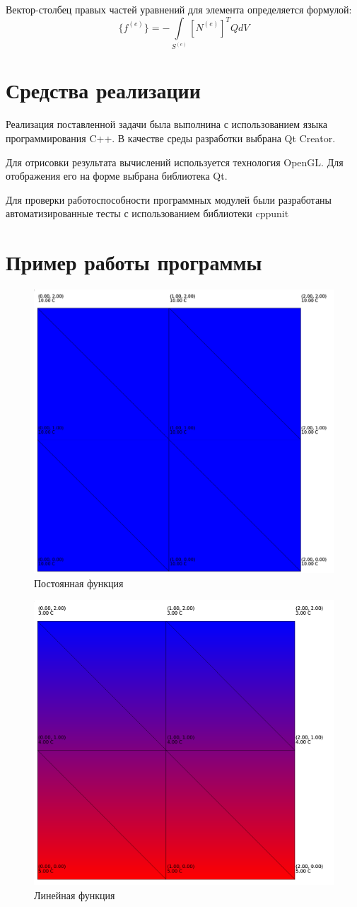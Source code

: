 \documentclass[a4paper, 14pt]{extarticle}
\begin{document}
Вектор-столбец правых частей уравнений для элемента определяется формулой:
\begin{equation}
	\{f^{(e)}\} = - \int\limits_{S^{(e)}} [N^{(e)}]^T QdV
\end{equation}

\clearpage
\section{Средства реализации}

Реализация поставленной задачи была выполнина с использованием языка
программирования C++. В качестве среды разработки выбрана Qt Creator.

Для отрисовки результата вычислений используется технология OpenGL. Для
отображения его на форме выбрана библиотека Qt.

Для проверки работоспособности программных модулей были разработаны
автоматизированные тесты с использованием библиотеки cppunit

\clearpage
\section{Пример работы программы}

\begin{figure}[h]
	\centering
	\includegraphics[width=0.5\linewidth]{images/test1}
	\caption[Рисунок]{Постоянная функция}
\end{figure}

\begin{figure}[h]
	\centering
	\includegraphics[width=0.5\linewidth]{images/test2}
	\caption[Рисунок]{Линейная функция}
\end{figure}
\end{document}
